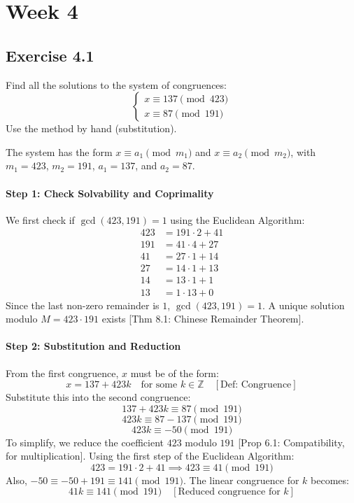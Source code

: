 \section*{Week 4}
\subsection*{Exercise 4.1}
Find all the solutions to the system of congruences:
$$ \begin{cases} x \equiv 137 \pmod{423} \\ x \equiv 87 \pmod{191} \end{cases} $$
Use the method by hand (substitution).

\begin{solution}
The system has the form $x \equiv a_1 \pmod{m_1}$ and $x \equiv a_2 \pmod{m_2}$, with $m_1=423$, $m_2=191$, $a_1=137$, and $a_2=87$.

\paragraph{Step 1: Check Solvability and Coprimality}
We first check if $\gcd(423, 191) = 1$ using the Euclidean Algorithm:
\begin{align*}
    423 &= 191 \cdot 2 + 41 \\
    191 &= 41 \cdot 4 + 27 \\
    41 &= 27 \cdot 1 + 14 \\
    27 &= 14 \cdot 1 + 13 \\
    14 &= 13 \cdot 1 + 1 \\
    13 &= 1 \cdot 13 + 0
\end{align*}
Since the last non-zero remainder is $1$, $\gcd(423, 191) = 1$. A unique solution modulo $M = 423 \cdot 191$ exists [Thm 8.1: Chinese Remainder Theorem].

\paragraph{Step 2: Substitution and Reduction}
From the first congruence, $x$ must be of the form:
$$ x = 137 + 423k \quad \text{for some } k \in \mathbb{Z} \quad [\text{Def: Congruence}]$$
Substitute this into the second congruence:
$$ 137 + 423k \equiv 87 \pmod{191} $$
$$ 423k \equiv 87 - 137 \pmod{191} $$
$$ 423k \equiv -50 \pmod{191} $$
To simplify, we reduce the coefficient $423$ modulo $191$ [Prop 6.1: Compatibility, for multiplication]. Using the first step of the Euclidean Algorithm:
$$ 423 = 191 \cdot 2 + 41 \implies 423 \equiv 41 \pmod{191} $$
Also, $-50 \equiv -50 + 191 \equiv 141 \pmod{191}$.
The linear congruence for $k$ becomes:
$$ 41k \equiv 141 \pmod{191} \quad [\text{Reduced congruence for } k] $$


\end{solution}
